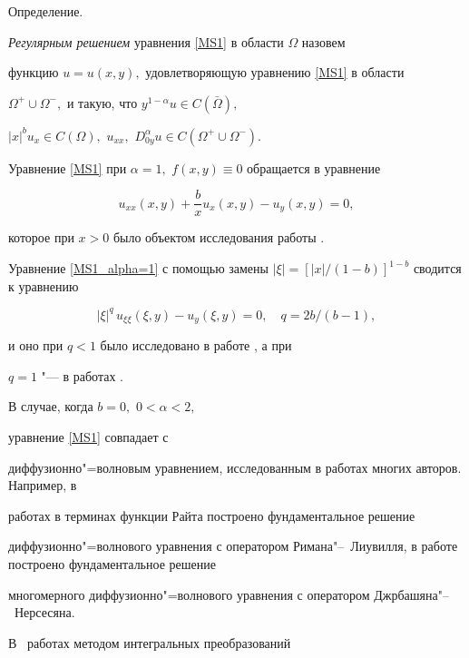 \smallskip

{\small\sc Определение.}

\textit{Регулярным   решением}    уравнения   \eqref{MS1}   в  области $\Omega$  назовем 

функцию  $u=u(x,y),$ удовлетворяющую уравнению  \eqref{MS1}  в области 

$\Omega^{+}\cup\Omega^{-},$ и такую, что $y^{1-\alpha}u\in{C(\bar{\Omega})},$ 

$|x|^b u_{x}\in{C(\Omega)},$ $u_{xx},$ $D_{0y}^{\alpha} u\in{C(\Omega^{+}\cup\Omega^{-})}.$



\smallskip



Уравнение \eqref{MS1} при  $\alpha=1,$ $f(x,y)\equiv 0$ обращается в уравнение

\begin{equation} \label{MS1_alpha=1}

u_{xx}(x,y)+\frac{b}{x} u_{x}(x,y) - u_y(x,y)=0,

\end{equation}

которое при $x>0$ было объектом исследования работы \cite{Tersenov}.

Уравнение \eqref{MS1_alpha=1} с помощью замены $|\xi|=\left[ |x|/(1-b)\right]^{1-b}$  сводится к уравнению

$$ 

|\xi|^{q} \, u_{\xi\xi}(\xi,y)- u_y(\xi,y)=0, \quad  q=2b/(b-1),

$$ 

и оно при $q<1$ было исследовано в работе \cite{Pagani}, а при 

$q=1$ "--- в работах  \cite{Kepinski, Arena}.



В случае, когда $b=0,$ $0<\alpha<2,$

 уравнение \eqref{MS1} совпадает с 

диффузионно"=волновым уравнением, исследованным в работах многих авторов. Например, в

работах \cite{Mainardi, MainardiApplied1996} в терминах функции Райта построено фундаментальное решение 

диффузионно"=волнового уравнения с оператором Римана"--~Лиувилля, в работе~\cite{Pskhu2}  построено фундаментальное решение 

многомерного диффузионно"=волнового уравнения с оператором Джрбашяна"--~Нерсесяна.

В ~работах \cite{VorKilbas, Gekk} методом интегральных преобразований  

